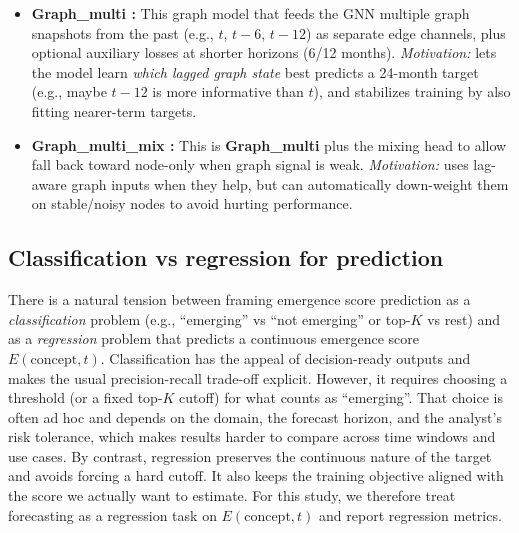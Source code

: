\documentclass{article}
\begin{document}
\begin{itemize}
  attention (feature-level mixing). In \textbf{Graph\_mix}, the model builds two separate temporal
  paths (node-only and graph-only) and mixes their \emph{predictions} after temporal attention using
  $\alpha$. These are not equivalent: \textbf{Graph\_base} changes the sequence fed into attention, whereas
  graph\_mix leaves the temporal dynamics separate and blends only the final outputs.
  \item \textbf{Graph\_multi :} This graph model that feeds the GNN multiple graph snapshots from the past
  (e.g., $t$, $t-6$, $t-12$) as separate edge channels, plus optional auxiliary losses at shorter
  horizons (6/12 months). \emph{Motivation:} lets the model learn \emph{which lagged graph state}
  best predicts a 24-month target (e.g., maybe $t-12$ is more informative than $t$), and stabilizes
  training by also fitting nearer-term targets.
  \item \textbf{Graph\_multi\_mix :} This is \textbf{Graph\_multi} plus the mixing head to allow fall back toward node-only when graph signal is weak. \emph{Motivation:} uses lag-aware graph inputs when they help, but can automatically down-weight them on stable/noisy nodes to avoid hurting performance.
\end{itemize}

\subsection{Classification vs regression for prediction}
There is a natural tension between framing emergence score prediction as a \emph{classification} problem (e.g., ``emerging'' vs ``not emerging'' or top-$K$ vs rest) and as a \emph{regression} problem that predicts a continuous emergence score $E(\text{concept}, t)$.
Classification has the appeal of decision-ready outputs and makes the usual precision-recall trade-off explicit.
However, it requires choosing a threshold (or a fixed top-$K$ cutoff) for what counts as ``emerging''.
That choice is often ad hoc and depends on the domain, the forecast horizon, and the analyst's risk tolerance, which makes results harder to compare across time windows and use cases.
By contrast, regression preserves the continuous nature of the target and avoids forcing a hard cutoff.
It also keeps the training objective aligned with the score we actually want to estimate.
For this study, we therefore treat forecasting as a regression task on $E(\text{concept}, t)$ and report regression metrics.
\end{document}
